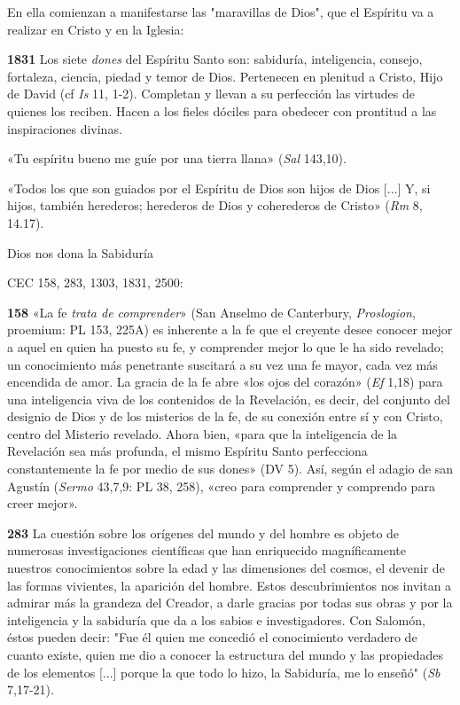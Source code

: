 \documentclass[]{article}
\begin{document}
En ella comienzan a manifestarse las "maravillas de Dios", que el
Espíritu va a realizar en Cristo y en la Iglesia:

\textbf{1831} Los siete \emph{dones} del Espíritu Santo son: sabiduría,
inteligencia, consejo, fortaleza, ciencia, piedad y temor de Dios.
Pertenecen en plenitud a Cristo, Hijo de David (cf \emph{Is} 11, 1-2).
Completan y llevan a su perfección las virtudes de quienes los reciben.
Hacen a los fieles dóciles para obedecer con prontitud a las
inspiraciones divinas.

«Tu espíritu bueno me guíe por una tierra llana» (\emph{Sal} 143,10).

«Todos los que son guiados por el Espíritu de Dios son hijos de Dios
{[}...{]} Y, si hijos, también herederos; herederos de Dios y
coherederos de Cristo» (\emph{Rm} 8, 14.17).

Dios nos dona la Sabiduría

CEC 158, 283, 1303, 1831, 2500:

\textbf{158} «La fe \emph{trata de comprender}» (San Anselmo de
Canterbury, \emph{Proslogion}, proemium: PL 153, 225A) es inherente a la
fe que el creyente desee conocer mejor a aquel en quien ha puesto su fe,
y comprender mejor lo que le ha sido revelado; un conocimiento más
penetrante suscitará a su vez una fe mayor, cada vez más encendida de
amor. La gracia de la fe abre «los ojos del corazón» (\emph{Ef} 1,18)
para una inteligencia viva de los contenidos de la Revelación, es decir,
del conjunto del designio de Dios y de los misterios de la fe, de su
conexión entre sí y con Cristo, centro del Misterio revelado. Ahora
bien, «para que la inteligencia de la Revelación sea más profunda, el
mismo Espíritu Santo perfecciona constantemente la fe por medio de sus
dones» (DV 5). Así, según el adagio de san Agustín (\emph{Sermo} 43,7,9:
PL 38, 258), «creo para comprender y comprendo para creer mejor».

\textbf{283} La cuestión sobre los orígenes del mundo y del hombre es
objeto de numerosas investigaciones científicas que han enriquecido
magníficamente nuestros conocimientos sobre la edad y las dimensiones
del cosmos, el devenir de las formas vivientes, la aparición del hombre.
Estos descubrimientos nos invitan a admirar más la grandeza del Creador,
a darle gracias por todas sus obras y por la inteligencia y la sabiduría
que da a los sabios e investigadores. Con Salomón, éstos pueden decir:
"Fue él quien me concedió el conocimiento verdadero de cuanto existe,
quien me dio a conocer la estructura del mundo y las propiedades de los
elementos {[}...{]} porque la que todo lo hizo, la Sabiduría, me lo
enseñó" (\emph{Sb} 7,17-21).
\end{document}
